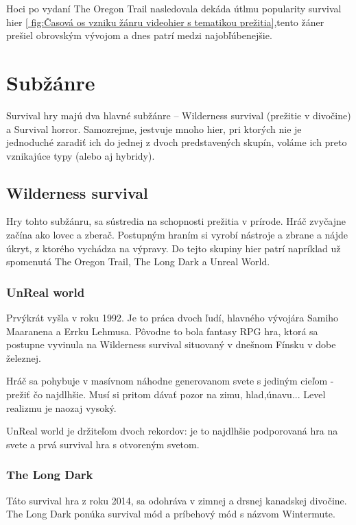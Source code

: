 \documentclass[10pt,oneoside,slovak,a4paper]{article}
\begin{document}
Hoci po vydaní The Oregon Trail nasledovala dekáda útlmu popularity survival hier \ref{ fig:Časová os vzniku žánru videohier s tematikou prežitia},tento žáner prešiel obrovským vývojom a dnes patrí medzi najobľúbenejšie. \cite{IGN}


\section{Subžánre} 
Survival hry majú dva hlavné subžánre – Wilderness survival (prežitie v divočine) a Survival  horror.  Samozrejme, jestvuje mnoho hier, pri ktorých nie je jednoduché zaradiť ich do jednej z dvoch predstavených skupín, voláme ich preto vznikajúce typy (alebo aj hybridy).\cite{Reid}

\subsection{Wilderness survival}

Hry tohto subžánru, sa sústredia na schopnosti prežitia v prírode. Hráč zvyčajne začína ako lovec a zberač. Postupným hraním si vyrobí nástroje a zbrane a nájde úkryt, z ktorého vychádza na výpravy. Do tejto skupiny hier patrí napríklad už spomenutá The Oregon Trail, The Long Dark a Unreal World.\cite{Wilds}

\subsubsection{UnReal world}
Prvýkrát vyšla v roku 1992. Je to práca dvoch ľudí, hlavného vývojára Samiho Maaranena a Errku Lehmusa. Pôvodne to bola fantasy RPG hra, ktorá sa postupne vyvinula na Wilderness survival situovaný v dnešnom Fínsku v dobe železnej. 

Hráč sa pohybuje v masívnom náhodne generovanom svete s jediným cieľom - prežiť čo najdlhšie. Musí si pritom dávať pozor na zimu, hlad,únavu... Level realizmu je naozaj vysoký.

UnReal world je držiteľom dvoch rekordov: je to najdlhšie podporovaná hra na svete a prvá survival hra s otvoreným svetom. \cite{UnRealWorld}

\subsubsection{The Long Dark}

Táto survival hra z roku 2014, sa odohráva v zimnej a drsnej kanadskej divočine. The Long Dark ponúka survival mód a príbehový mód s názvom Wintermute.
\end{document}
